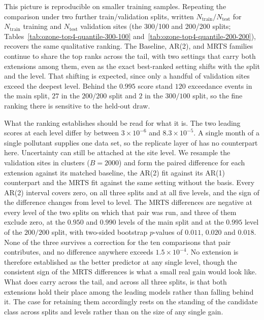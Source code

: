 \documentclass[12pt]{article}
\begin{document}
This picture is reproducible on smaller training samples.  Repeating the comparison under two further train/validation splits, written $N_{\text{train}}/N_{\text{test}}$ for $N_{\text{train}}$ training and $N_{\text{test}}$ validation sites (the 300/100 and 200/200 splits; Tables~\ref{tab:ozone-top4-quantile-300-100} and~\ref{tab:ozone-top4-quantile-200-200}), recovers the same qualitative ranking.  The Baseline, AR(2), and MRTS families continue to share the top ranks across the tail, with two settings that carry both extensions among them, even as the exact best-ranked setting shifts with the split and the level.  That shifting is expected, since only a handful of validation sites exceed the deepest level.  Behind the $0.995$ score stand $120$ exceedance events in the main split, $27$ in the $200/200$ split and $2$ in the $300/100$ split, so the fine ranking there is sensitive to the held-out draw.

What the ranking establishes should be read for what it is.  The two leading scores at each level differ by between $3 \times 10^{-6}$ and $8.3 \times 10^{-5}$.  A single month of a single pollutant supplies one data set, so the replicate layer of  has no counterpart here.  Uncertainty can still be attached at the site level.  We resample the validation sites in clusters ($B = 2000$) and form the paired difference for each extension against its matched baseline, the AR(2) fit against its AR(1) counterpart and the MRTS fit against the same setting without the basis.  Every AR(2) interval covers zero, on all three splits and at all five levels, and the sign of the difference changes from level to level.  The MRTS differences are negative at every level of the two splits on which that pair was run, and three of them exclude zero, at the $0.950$ and $0.990$ levels of the main split and at the $0.995$ level of the $200/200$ split, with two-sided bootstrap $p$-values of $0.011$, $0.020$ and $0.018$.  None of the three survives a correction for the ten comparisons that pair contributes, and no difference anywhere exceeds $1.5 \times 10^{-4}$.  No extension is therefore established as the better predictor at any single level, though the consistent sign of the MRTS differences is what a small real gain would look like.  What does carry across the tail, and across all three splits, is that both extensions hold their place among the leading models rather than falling behind it.  The case for retaining them accordingly rests on the standing of the candidate class across splits and levels rather than on the size of any single gain.
\end{document}
